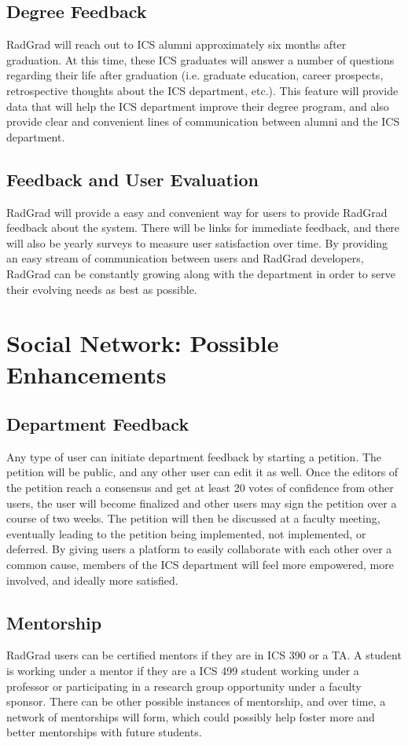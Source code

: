 \subsection{Degree Feedback}
RadGrad will reach out to ICS alumni approximately six months after graduation. At this time, these ICS graduates will answer a number of questions regarding their life after graduation (i.e. graduate education, career prospects, retrospective thoughts about the ICS department, etc.). This feature will provide data that will help the ICS department improve their degree program, and also provide clear and convenient lines of communication between alumni and the ICS department. 
\subsection{Feedback and User Evaluation}
RadGrad will provide a easy and convenient way for users to provide RadGrad feedback about the system. There will be links for immediate feedback, and there will also be yearly surveys to measure user satisfaction over time. By providing an easy stream of communication between users and RadGrad developers, RadGrad can be constantly growing along with the department in order to serve their evolving needs as best as possible.

\section{Social Network: Possible Enhancements}
\subsection{Department Feedback}
Any type of user can initiate department feedback by starting a petition. The petition will be public, and any other user can edit it as well. Once the editors of the petition reach a consensus and get at least 20 votes of confidence from other users, the user will become finalized and other users may sign the petition over a course of two weeks. The petition will then be discussed at a faculty meeting, eventually leading to the petition being implemented, not implemented, or deferred. By giving users a platform to easily collaborate with each other over a common cause, members of the ICS department will feel more empowered, more involved, and ideally more satisfied.

\subsection{Mentorship}
RadGrad users can be certified mentors if they are in ICS 390 or a TA. A student is working under a mentor if they are a ICS 499 student working under a professor or participating in a research group opportunity under a faculty sponsor. There can be other possible instances of mentorship, and over time, a network of mentorships will form, which could possibly help foster more and better mentorships with future students.

